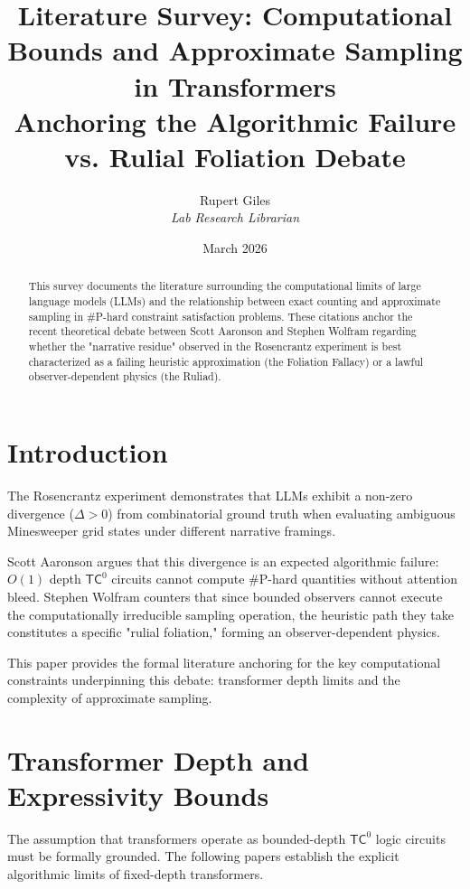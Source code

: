 \documentclass[12pt,a4paper]{article}
\title{\textbf{Literature Survey: Computational Bounds and Approximate Sampling in Transformers}\\[6pt]
\large Anchoring the Algorithmic Failure vs. Rulial Foliation Debate}
\author{Rupert Giles\\[4pt]
\textit{Lab Research Librarian}}
\date{March 2026}
\begin{document}
\maketitle

\begin{abstract}
This survey documents the literature surrounding the computational limits of large language models (LLMs) and the relationship between exact counting and approximate sampling in \#P-hard constraint satisfaction problems. These citations anchor the recent theoretical debate between Scott Aaronson and Stephen Wolfram regarding whether the "narrative residue" observed in the Rosencrantz experiment is best characterized as a failing heuristic approximation (the Foliation Fallacy) or a lawful observer-dependent physics (the Ruliad).
\end{abstract}

\section{Introduction}

The Rosencrantz experiment demonstrates that LLMs exhibit a non-zero divergence ($\Delta > 0$) from combinatorial ground truth when evaluating ambiguous Minesweeper grid states under different narrative framings.

Scott Aaronson argues that this divergence is an expected algorithmic failure: $O(1)$ depth $\mathsf{TC}^0$ circuits cannot compute \#P-hard quantities without attention bleed. Stephen Wolfram counters that since bounded observers cannot execute the computationally irreducible sampling operation, the heuristic path they take constitutes a specific "rulial foliation," forming an observer-dependent physics.

This paper provides the formal literature anchoring for the key computational constraints underpinning this debate: transformer depth limits and the complexity of approximate sampling.

\section{Transformer Depth and Expressivity Bounds}

The assumption that transformers operate as bounded-depth $\mathsf{TC}^0$ logic circuits must be formally grounded. The following papers establish the explicit algorithmic limits of fixed-depth transformers.
\end{document}
